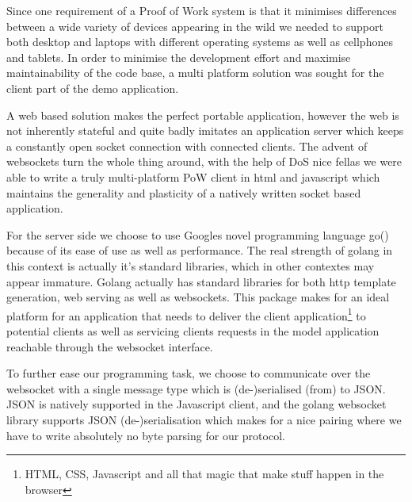Since one requirement of a Proof of Work system is that it minimises differences between a wide variety of devices appearing in the wild we needed to support both desktop and laptops with different operating systems as well as cellphones and tablets.
In order to minimise the development effort and maximise maintainability of the code base, a multi platform solution was sought for the client part of the demo application. 

A web based solution makes the perfect portable application, however the web is not inherently stateful and quite badly imitates an application server which keeps a constantly open socket connection with connected clients. The advent of websockets turn the whole thing around, with the help of DoS nice fellas we were able to write a truly multi-platform PoW client in html and javascript which maintains the generality and plasticity of a natively written socket based application. 

For the server side we choose to use Googles novel programming language go() because of its ease of use as well as performance. The real strength of golang in this context is actually it's standard libraries, which in other contextes may appear immature. Golang actually has standard libraries for both http template generation, web serving as well as websockets. This package makes for an ideal platform for an application that needs to deliver the client application\footnote{HTML, CSS, Javascript and all that magic that make stuff happen in the browser} to potential clients as well as servicing clients requests in the model application reachable through the websocket interface. 

To further ease our programming task, we choose to communicate over the websocket with a single message type which is (de-)serialised (from) to JSON. JSON is natively supported in the Javascript client, and the golang websocket library supports JSON (de-)serialisation which makes for a nice pairing where we have to write absolutely no byte parsing for our protocol.



